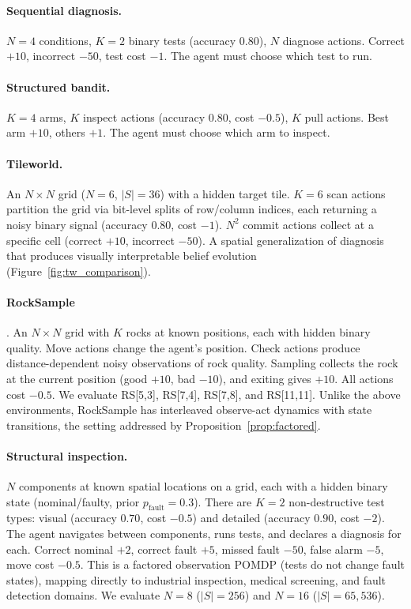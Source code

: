\documentclass[runningheads]{llncs}
\begin{document}
\paragraph{Sequential diagnosis.} $N{=}4$ conditions, $K{=}2$ binary tests (accuracy 0.80), $N$ diagnose actions. Correct $+10$, incorrect $-50$, test cost $-1$. The agent must choose which test to run.

\paragraph{Structured bandit.} $K{=}4$ arms, $K$ inspect actions (accuracy 0.80, cost $-0.5$), $K$ pull actions. Best arm $+10$, others $+1$. The agent must choose which arm to inspect.

\paragraph{Tileworld.} An $N{\times}N$ grid ($N{=}6$, $|S|{=}36$) with a hidden target tile. $K{=}6$ scan actions partition the grid via bit-level splits of row/column indices, each returning a noisy binary signal (accuracy $0.80$, cost $-1$). $N^2$ commit actions collect at a specific cell (correct $+10$, incorrect $-50$). A spatial generalization of diagnosis that produces visually interpretable belief evolution (Figure~\ref{fig:tw_comparison}).

\paragraph{RockSample} \citep{smith2004}. An $N{\times}N$ grid with $K$ rocks at known positions, each with hidden binary quality. Move actions change the agent's position. Check actions produce distance-dependent noisy observations of rock quality. Sampling collects the rock at the current position (good $+10$, bad $-10$), and exiting gives $+10$. All actions cost $-0.5$. We evaluate RS[5,3], RS[7,4], RS[7,8], and RS[11,11]. Unlike the above environments, RockSample has interleaved observe-act dynamics with state transitions, the setting addressed by Proposition~\ref{prop:factored}.

\paragraph{Structural inspection.} $N$ components at known spatial locations on a grid, each with a hidden binary state (nominal/faulty, prior $p_{\text{fault}}{=}0.3$). There are $K{=}2$ non-destructive test types: visual (accuracy $0.70$, cost $-0.5$) and detailed (accuracy $0.90$, cost $-2$). The agent navigates between components, runs tests, and declares a diagnosis for each. Correct nominal $+2$, correct fault $+5$, missed fault $-50$, false alarm $-5$, move cost $-0.5$. This is a factored observation POMDP (tests do not change fault states), mapping directly to industrial inspection, medical screening, and fault detection domains. We evaluate $N{=}8$ ($|S|{=}256$) and $N{=}16$ ($|S|{=}65{,}536$).
\end{document}

